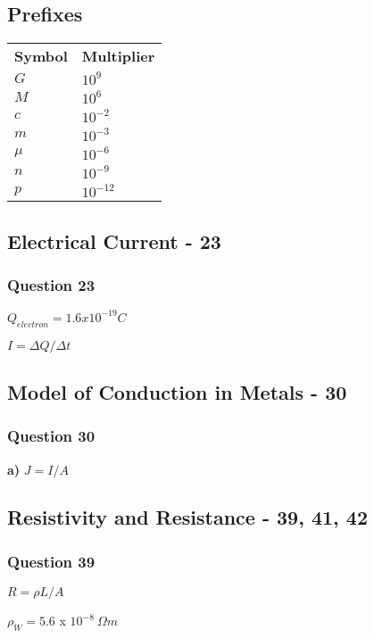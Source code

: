 \documentclass[12pt, letterpaper, twoside]{article}
\begin{document}
    
  \subsection*{Prefixes}
    \begin{tabular}{l l}
  	  \textbf{Symbol} & \textbf{Multiplier}\\
      $G$ & $10^9$\\
      $M$ & $10^6$\\
      $c$ & $10^{-2}$\\
      $m$ & $10^{-3}$\\
      $\mu$ & $10^{-6}$\\
      $n$ & $10^{-9}$\\
      $p$ & $10^{-12}$\\
      
    
  \end{tabular}
    
  \subsection{Electrical Current - 23}
    \subsubsection*{Question 23}
      \begin{description}
        \item $Q_{electron} = 1.6x10^{-19}C$
        \item $I = \Delta Q / \Delta t$
      \end{description}      
  \subsection{Model of Conduction in Metals - 30}
    \subsubsection*{Question 30}
      \begin{description}
        \item \textbf{a)} $J = I/A$
      \end{description}
  \subsection{Resistivity and Resistance - 39, 41, 42}
    \subsubsection*{Question 39}
      \begin{description}
        \item $R = \rho L/A$
        \item $\rho_{W} = 5.6$ x $10^{-8} \ \Omega m$
      \end{description}
\end{document}
